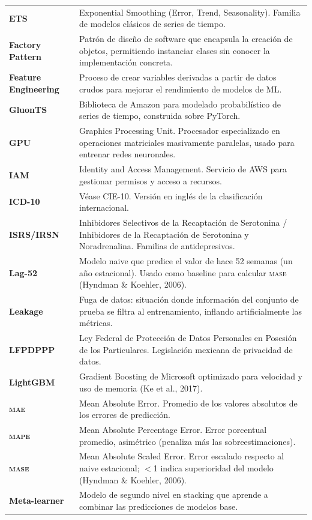 \documentclass[12pt, letterpaper]{article}
\newcommand{\mase}{\textnormal{\textsc{mase}}}
\newcommand{\mae}{\textnormal{\textsc{mae}}}
\newcommand{\mape}{\textnormal{\textsc{mape}}}
\begin{document}
\begin{longtable}{>{\bfseries}l p{11cm}}
ETS & Exponential Smoothing (Error, Trend, Seasonality). Familia de modelos clásicos de series de tiempo. \\
Factory Pattern & Patrón de diseño de software que encapsula la creación de objetos, permitiendo instanciar clases sin conocer la implementación concreta. \\
Feature Engineering & Proceso de crear variables derivadas a partir de datos crudos para mejorar el rendimiento de modelos de ML. \\
GluonTS & Biblioteca de Amazon para modelado probabilístico de series de tiempo, construida sobre PyTorch. \\
GPU & Graphics Processing Unit. Procesador especializado en operaciones matriciales masivamente paralelas, usado para entrenar redes neuronales. \\
IAM & Identity and Access Management. Servicio de AWS para gestionar permisos y acceso a recursos. \\
ICD-10 & Véase CIE-10. Versión en inglés de la clasificación internacional. \\
ISRS/IRSN & Inhibidores Selectivos de la Recaptación de Serotonina / Inhibidores de la Recaptación de Serotonina y Noradrenalina. Familias de antidepresivos. \\
Lag-52 & Modelo naive que predice el valor de hace 52 semanas (un año estacional). Usado como baseline para calcular \mase{} (Hyndman \& Koehler, 2006). \\
Leakage & Fuga de datos: situación donde información del conjunto de prueba se filtra al entrenamiento, inflando artificialmente las métricas. \\
LFPDPPP & Ley Federal de Protección de Datos Personales en Posesión de los Particulares. Legislación mexicana de privacidad de datos. \\
LightGBM & Gradient Boosting de Microsoft optimizado para velocidad y uso de memoria (Ke et al., 2017). \\
\mae{} & Mean Absolute Error. Promedio de los valores absolutos de los errores de predicción. \\
\mape{} & Mean Absolute Percentage Error. Error porcentual promedio, asimétrico (penaliza más las sobreestimaciones). \\
\mase{} & Mean Absolute Scaled Error. Error escalado respecto al naive estacional; $<$1 indica superioridad del modelo (Hyndman \& Koehler, 2006). \\
Meta-learner & Modelo de segundo nivel en stacking que aprende a combinar las predicciones de modelos base. \\

\end{longtable}
\end{document}
